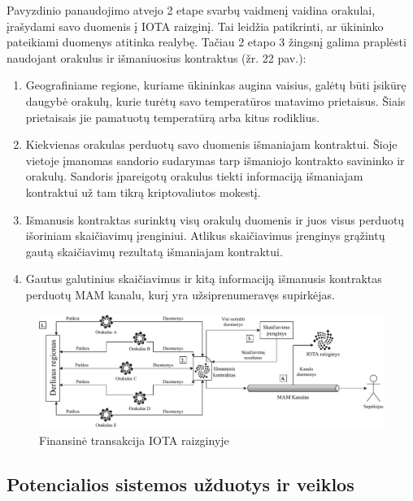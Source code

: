 Pavyzdinio panaudojimo atvejo 2 etape svarbų vaidmenį vaidina orakulai, įrašydami savo duomenis į IOTA raizginį. Tai leidžia patikrinti, ar ūkininko pateikiami duomenys atitinka realybę. Tačiau 2 etapo 3 žingsnį galima praplėsti naudojant orakulus ir išmaniuosius kontraktus (žr. 22 pav.): 
\begin{enumerate}
    \item Geografiniame regione, kuriame ūkininkas augina vaisius, galėtų būti įsikūrę daugybė orakulų, kurie turėtų savo temperatūros matavimo prietaisus. Šiais prietaisais jie pamatuotų temperatūrą arba kitus rodiklius.
    \item Kiekvienas orakulas perduotų savo duomenis išmaniajam kontraktui. Šioje vietoje įmanomas sandorio sudarymas tarp išmaniojo kontrakto savininko ir orakulų. Sandoris įpareigotų orakulus tiekti informaciją išmaniajam kontraktui už tam tikrą kriptovaliutos mokestį.
    \item Išmanusis kontraktas surinktų visų orakulų duomenis ir juos visus perduotų išoriniam skaičiavimų įrenginiui. Atlikus skaičiavimus įrenginys grąžintų gautą skaičiavimų rezultatą išmaniajam kontraktui.
    \item Gautus galutinius skaičiavimus ir kitą informaciją išmanusis kontraktas perduotų MAM kanalu, kurį yra užsiprenumeravęs supirkėjas.
\end{enumerate}

\begin{figure}[H]
    \centering
    \includegraphics[scale=0.63]{images/tangle-smart-contract}
    \caption{Finansinė transakcija IOTA raizginyje}
\end{figure}




\subsection{Potencialios sistemos užduotys ir veiklos}

